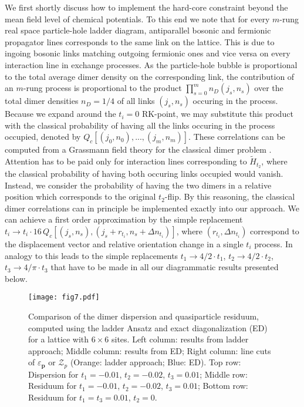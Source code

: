\documentclass[aps,pra,reprint,showpacs,superscriptaddress]{revtex4-1}
\newcommand\bs[1]{\ensuremath{\boldsymbol{#1}}}
\begin{document}
We first shortly discuss how to implement the hard-core constraint beyond the mean field level of chemical potentials. To this end we note that for every $m$-rung real space particle-hole ladder diagram, antiparallel bosonic and fermionic propagator lines corresponds to the same link on the lattice. This is due to ingoing bosonic links matching outgoing fermionic ones and vice versa on every interaction line in exchange processes. As the particle-hole bubble is proportional to the total average dimer density on the corresponding link, the contribution of an $m$-rung process is proportional to the product $\prod_{s=0}^{m} n_D(j_s,n_s)$ over the total dimer densities $n_D=1/4$ of all links $(j_s,n_s)$ occuring in the process. Because we expand around the $t_i=0$ RK-point, we may substitute this product with the classical probability of having all the links occuring in the process occupied, denoted by $Q_c[(j_0,n_0),...,(j_m,n_m)]$.  These correlations can be computed from a Grassmann field theory for the classical dimer problem \cite{samuel1980use}. Attention has to be paid only for interaction lines corresponding to $\tilde{H}_{t_2}$, where the classical probability of having both occuring links occupied would vanish. Instead, we consider the probability of having the two dimers in a relative position which corresponds to the original $t_2$-flip. By this reasoning, the classical dimer correlations can in principle be implemented exactly into our approach. We can achieve a first order approximation by the simple replacement $t_i\rightarrow t_i\cdot 16\,Q_c[(j_s,n_s),(j_{s}+r_{t_i},n_{s}+\Delta n_{t_i})]$, where $(r_{t_i},\Delta n_{t_i})$ correspond to the displacement vector and relative orientation change in a single $t_i$ process. In analogy to \cite{punk2015quantum} this leads to the simple replacements $t_1\rightarrow 4/2\cdot t_1$, $t_2\rightarrow 4/2\cdot t_2$, $t_3\rightarrow 4/\pi\cdot t_3$ that have to be made in all our diagrammatic results presented below.

\begin{figure*}
\centering
\texttt{[image: fig7.pdf]}
\caption{Comparison of the dimer dispersion and quasiparticle residuum, computed using the ladder Ansatz and exact diagonalization (ED) for a lattice with $6\times6$ sites. Left column: results from ladder approach; Middle column: results from ED; Right column: line cuts of $\varepsilon_{\bs{p}}$ or $\mathcal{Z}_p$ (Orange: ladder approach; Blue: ED).  Top row: Dispersion for $t_1=-0.01$, $t_2=-0.02$, $t_3=0.01$; Middle row: Residuum for  $t_1=-0.01$, $t_2=-0.02$, $t_3=0.01$; Bottom row: Residuum for $t_1=t_3=0.01$, $t_2=0$.}
\label{fig:residuum1}
\end{figure*}
\end{document}
